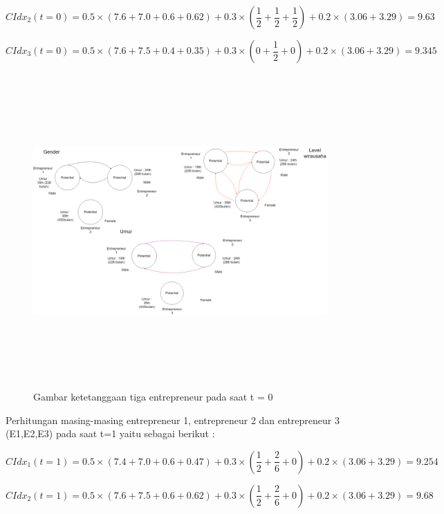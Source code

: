 \begin{equation}
	CIdx_{2}(t=0) = 0.5 \times (7.6 + 7.0 + 0.6 + 0.62) + 0.3 \times (\frac {1} {2} + \frac {1} {2} + \frac {1} {2}) + 0.2 \times (3.06 + 3.29) = 9.63
\end{equation}

\begin{equation}
	CIdx_{3}(t=0) = 0.5 \times (7.6 + 7.5 + 0.4 + 0.35) + 0.3 \times (0 + \frac {1} {2} + 0) + 0.2 \times (3.06 + 3.29) = 9.345
\end{equation}

	\begin{figure} [H]
		\centering  
		\includegraphics[width=18cm, height=12cm]{gambarwirausaha(t=0)} 
		\caption[Gambar ketetanggaan tiga entrepreneur pada saat t = 0]{Gambar ketetanggaan tiga entrepreneur pada saat t = 0} 
		\label{fig:t0} 
	\end{figure}

Perhitungan masing-masing entrepreneur 1, entrepreneur 2 dan entrepreneur 3 (E1,E2,E3) pada saat t=1 yaitu sebagai berikut :

\begin{equation}
	CIdx_{1}(t=1) = 0.5 \times (7.4 + 7.0 + 0.6 + 0.47) + 0.3 \times (\frac {1} {2} + \frac {2} {6}  + 0) + 0.2 \times (3.06 + 3.29) = 9.254
\end{equation}

\begin{equation}
	CIdx_{2}(t=1) = 0.5 \times (7.6 + 7.5 + 0.6 + 0.62) + 0.3 \times (\frac {1} {2} + \frac {2} {6} + 0) + 0.2 \times (3.06 + 3.29) = 9.68
\end{equation}

